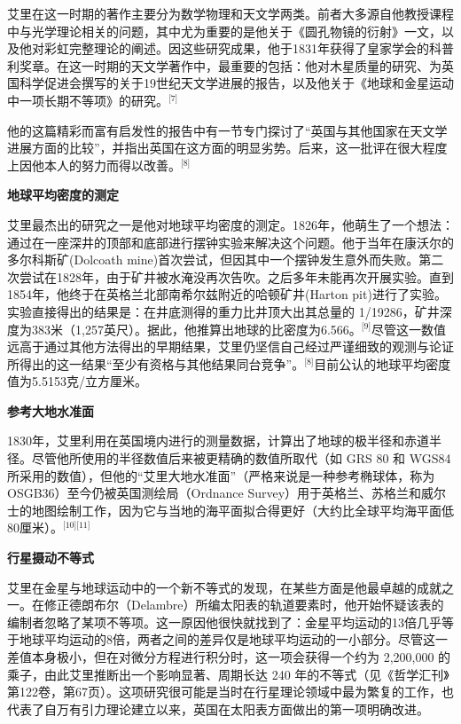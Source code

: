 艾里在这一时期的著作主要分为数学物理和天文学两类。前者大多源自他教授课程中与光学理论相关的问题，其中尤为重要的是他关于《圆孔物镜的衍射》一文，以及他对彩虹完整理论的阐述。因这些研究成果，他于1831年获得了皇家学会的科普利奖章。在这一时期的天文学著作中，最重要的包括：他对木星质量的研究、为英国科学促进会撰写的关于19世纪天文学进展的报告，以及他关于《地球和金星运动中一项长期不等项》的研究。\(^\text{[7]}\)

他的这篇精彩而富有启发性的报告中有一节专门探讨了“英国与其他国家在天文学进展方面的比较”，并指出英国在这方面的明显劣势。后来，这一批评在很大程度上因他本人的努力而得以改善。\(^\text{[8]}\)

\textbf{地球平均密度的测定}

艾里最杰出的研究之一是他对地球平均密度的测定。1826年，他萌生了一个想法：通过在一座深井的顶部和底部进行摆钟实验来解决这个问题。他于当年在康沃尔的多尔科斯矿(Dolcoath mine)首次尝试，但因其中一个摆钟发生意外而失败。第二次尝试在1828年，由于矿井被水淹没再次告吹。之后多年未能再次开展实验。直到1854年，他终于在英格兰北部南希尔兹附近的哈顿矿井(Harton pit)进行了实验。实验直接得出的结果是：在井底测得的重力比井顶大出其总量的 1/19286，矿井深度为383米（1,257英尺）。据此，他推算出地球的比密度为6.566。\(^\text{[9]}\)尽管这一数值远高于通过其他方法得出的早期结果，艾里仍坚信自己经过严谨细致的观测与论证所得出的这一结果“至少有资格与其他结果同台竞争”。\(^\text{[8]}\)目前公认的地球平均密度值为5.5153克/立方厘米。

\textbf{参考大地水准面}

1830年，艾里利用在英国境内进行的测量数据，计算出了地球的极半径和赤道半径。尽管他所使用的半径数值后来被更精确的数值所取代（如 GRS 80 和 WGS84 所采用的数值），但他的“艾里大地水准面”（严格来说是一种参考椭球体，称为 OSGB36）至今仍被英国测绘局（Ordnance Survey）用于英格兰、苏格兰和威尔士的地图绘制工作，因为它与当地的海平面拟合得更好（大约比全球平均海平面低80厘米）。\(^\text{[10][11]}\)

\textbf{行星摄动不等式}

艾里在金星与地球运动中的一个新不等式的发现，在某些方面是他最卓越的成就之一。在修正德朗布尔（Delambre）所编太阳表的轨道要素时，他开始怀疑该表的编制者忽略了某项不等项。这一原因他很快就找到了：金星平均运动的13倍几乎等于地球平均运动的8倍，两者之间的差异仅是地球平均运动的一小部分。尽管这一差值本身极小，但在对微分方程进行积分时，这一项会获得一个约为 2,200,000 的乘子，由此艾里推断出一个影响显著、周期长达 240 年的不等式（见《哲学汇刊》第122卷，第67页）。这项研究很可能是当时在行星理论领域中最为繁复的工作，也代表了自万有引力理论建立以来，英国在太阳表方面做出的第一项明确改进。

